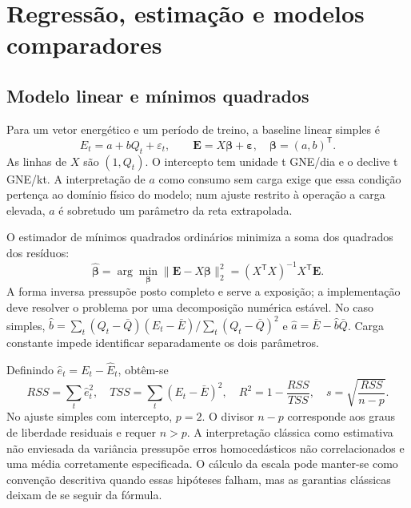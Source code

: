 
\section{Regressão, estimação e modelos comparadores}
\label{sec:mat-regressao}

\subsection{Modelo linear e mínimos quadrados}
\label{sec:mat-ols}
Para um vetor energético e um período de treino, a baseline linear simples é
\begin{equation}
E_t=a+bQ_t+\varepsilon_t,
\qquad \boldsymbol E=X\boldsymbol\beta+\boldsymbol\varepsilon,
\quad \boldsymbol\beta=(a,b)^{\mathsf T}.
\label{eq:mat-modelo-linear}
\end{equation}
As linhas de $X$ são $(1,Q_t)$. O intercepto tem unidade t GNE/dia e o declive t GNE/kt. A interpretação de $a$ como consumo sem carga exige que essa condição pertença ao domínio físico do modelo; num ajuste restrito à operação a carga elevada, $a$ é sobretudo um parâmetro da reta extrapolada.

O estimador de mínimos quadrados ordinários minimiza a soma dos quadrados dos resíduos:
\begin{equation}
\widehat{\boldsymbol\beta}
=\arg\min_{\boldsymbol\beta}\|\boldsymbol E-X\boldsymbol\beta\|_2^2
=(X^{\mathsf T}X)^{-1}X^{\mathsf T}\boldsymbol E.
\label{eq:mat-ols}
\end{equation}
A forma inversa pressupõe posto completo e serve a exposição; a implementação deve resolver o problema por uma decomposição numérica estável. No caso simples, $\widehat b=\sum_t(Q_t-\bar Q)(E_t-\bar E)/\sum_t(Q_t-\bar Q)^2$ e $\widehat a=\bar E-\widehat b\bar Q$. Carga constante impede identificar separadamente os dois parâmetros.

Definindo $\widehat e_t=E_t-\widehat E_t$, obtêm-se
\begin{equation}
RSS=\sum_t\widehat e_t^2,
\quad TSS=\sum_t(E_t-\bar E)^2,
\quad R^2=1-\frac{RSS}{TSS},
\quad s=\sqrt{\frac{RSS}{n-p}}.
\label{eq:mat-rss-escala}
\end{equation}
No ajuste simples com intercepto, $p=2$. O divisor $n-p$ corresponde aos graus de liberdade residuais e requer $n>p$. A interpretação clássica como estimativa não enviesada da variância pressupõe erros homocedásticos não correlacionados e uma média corretamente especificada. O cálculo da escala pode manter-se como convenção descritiva quando essas hipóteses falham, mas as garantias clássicas deixam de se seguir da fórmula.

